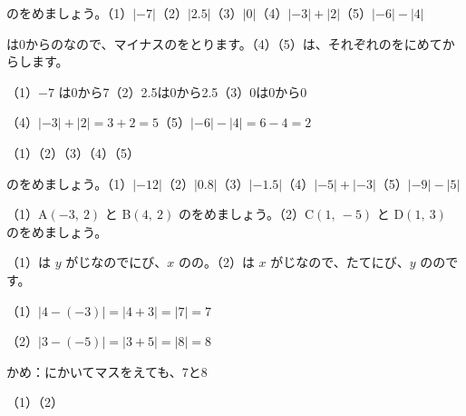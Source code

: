 \begin{reidai}[\R{絶対値}{ぜっ|たい|ち}]
のをめましょう。（1）$\lvert -7\rvert $\quad（2）$\lvert 2.5\rvert $\quad（3）$\lvert 0\rvert $\quad（4）$\lvert -3\rvert +\lvert 2\rvert $\quad（5）$\lvert -6\rvert -\lvert 4\rvert $\par
\kangaekata {}は0からのなので、マイナスのをとります。（4）（5）は、それぞれのをにめてからします。\par
\shiki（1）\nobreak $-7$ は0から7\quad（2）\nobreak 2.5は0から2.5\quad（3）\nobreak 0は0から0\par
\hspace*{2.6\zw}（4）\nobreak $\lvert -3\rvert +\lvert 2\rvert =3+2=5$\quad（5）\nobreak $\lvert -6\rvert -\lvert 4\rvert =6-4=2$\par
\kotae（1）\quad（2）\quad（3）\quad（4）\quad（5）
\end{reidai}

\begin{jibun}
のをめましょう。（1）$\lvert -12\rvert $\quad（2）$\lvert 0.8\rvert $\quad（3）$\lvert -1.5\rvert $\quad（4）$\lvert -5\rvert +\lvert -3\rvert $\quad（5）$\lvert -9\rvert -\lvert 5\rvert $
\end{jibun}

\begin{reidai}[\R{横}{よこ}・たてに\R{並}{なら}んだ2\R{点}{てん}の\R{距離}{きょ|り}]
（1）A$(-3,\ 2)$ と B$(4,\ 2)$ のをめましょう。（2）C$(1,\ -5)$ と D$(1,\ 3)$ のをめましょう。\par
\kangaekata（1）は $y$ がじなのでにび、$x$ のの。（2）は $x$ がじなので、たてにび、$y$ ののです。\par
\shiki（1）\nobreak $\lvert 4-(-3)\rvert =\lvert 4+3\rvert =\lvert 7\rvert =7$\par
\hspace*{2.6\zw}（2）\nobreak $\lvert 3-(-5)\rvert =\lvert 3+5\rvert =\lvert 8\rvert =8$\par
\hspace*{2.6\zw}かめ：にかいてマスをえても、7と8\par
\kotae（1）\quad（2）
\end{reidai}

